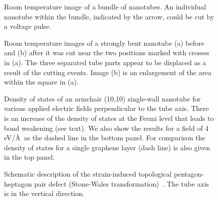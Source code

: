 \begin{multicols}{2}
\begin{figure}
\caption[]{ Room temperature image of a bundle of nanotubes. An
individual nanotube within the bundle, indicated by the arrow,
could be cut by a voltage pulse.}
\end{figure}

\begin{figure}
\caption[]{Room temperature images of a strongly bent nanotube (a)
before and (b) after it was cut near the two positions marked with
crosses in (a). The three separated tube parts appear to be
displaced as a result of the cutting events. Image (b) is an
enlargement of the area within the square in (a).}
\end{figure}

\begin{figure}
\caption[]{Density of states of an armchair (10,10) single-wall
nanotube for various applied electric fields perpendicular to the
tube axis. There is an increase of the density of states at the
Fermi level that leads to bond weakening (see text). We also show
the results for a field of 4 eV/\AA\ as the dashed line in the
bottom panel. For comparison the density of states for a single
graphene layer (dash line) is also given in the top panel.}
\end{figure}


\begin{figure}
\caption[]{Schematic description of the strain-induced topological
pentagon-heptagon pair defect (Stone-Wales
transformation)~\cite{SW}. The tube axis is in the vertical
direction. }
\end{figure}



\end{multicols}



